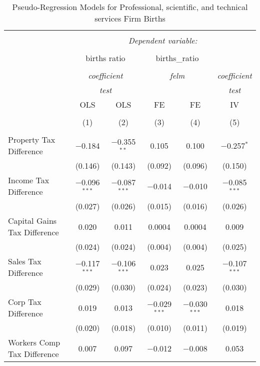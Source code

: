 
\begin{table}[!htbp] \centering 
  \caption{Pseudo-Regression Models for  Professional, scientific, and technical services Firm Births} 
  \label{} 
\begin{tabular}{@{\extracolsep{5pt}}lccccc} 
\\[-1.8ex]\hline 
\hline \\[-1.8ex] 
 & \multicolumn{5}{c}{\textit{Dependent variable:}} \\ 
\cline{2-6} 
\\[-1.8ex] & \multicolumn{2}{c}{births ratio} & \multicolumn{2}{c}{births\_ratio} &   \\ 
\\[-1.8ex] & \multicolumn{2}{c}{\textit{coefficient}} & \multicolumn{2}{c}{\textit{felm}} & \textit{coefficient} \\ 
 & \multicolumn{2}{c}{\textit{test}} & \multicolumn{2}{c}{\textit{}} & \textit{test} \\ 
 & OLS & OLS & FE & FE & IV \\ 
\\[-1.8ex] & (1) & (2) & (3) & (4) & (5)\\ 
\hline \\[-1.8ex] 
 Property Tax Difference & $-$0.184 & $-$0.355$^{**}$ & 0.105 & 0.100 & $-$0.257$^{*}$ \\ 
  & (0.146) & (0.143) & (0.092) & (0.096) & (0.150) \\ 
  Income Tax Difference & $-$0.096$^{***}$ & $-$0.087$^{***}$ & $-$0.014 & $-$0.010 & $-$0.085$^{***}$ \\ 
  & (0.027) & (0.026) & (0.015) & (0.016) & (0.026) \\ 
  Capital Gains Tax Difference & 0.020 & 0.011 & 0.0004 & 0.0004 & 0.009 \\ 
  & (0.024) & (0.024) & (0.004) & (0.004) & (0.025) \\ 
  Sales Tax Difference & $-$0.117$^{***}$ & $-$0.106$^{***}$ & 0.023 & 0.025 & $-$0.107$^{***}$ \\ 
  & (0.029) & (0.030) & (0.024) & (0.023) & (0.030) \\ 
  Corp Tax Difference & 0.019 & 0.013 & $-$0.029$^{***}$ & $-$0.030$^{***}$ & 0.018 \\ 
  & (0.020) & (0.018) & (0.010) & (0.011) & (0.019) \\ 
  Workers Comp Tax Difference & 0.007 & 0.097 & $-$0.012 & $-$0.008 & 0.053 \\ 

\end{tabular}
\end{table}
